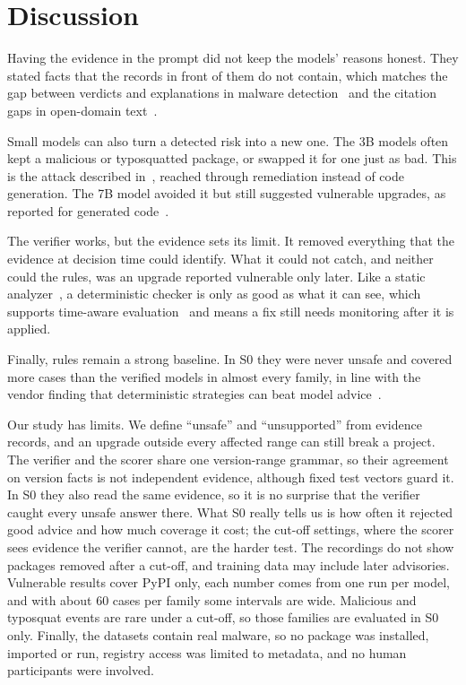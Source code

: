 \documentclass[conference]{IEEEtran}
\begin{document}
\section{Discussion}
Having the evidence in the prompt did not keep the models' reasons honest. They stated facts that the records in
front of them do not contain, which matches the gap between verdicts and explanations in malware
detection~\cite{ryan2026} and the citation gaps in open-domain text~\cite{gao2023}.

Small models can also turn a detected risk into a new one. The 3B models often kept a malicious or typosquatted
package, or swapped it for one just as bad. This is the attack described in~\cite{spracklen2025,neupane2023},
reached through remediation instead of code generation. The 7B model avoided it but still suggested vulnerable
upgrades, as reported for generated code~\cite{wang2026}.

The verifier works, but the evidence sets its limit. It removed everything that the evidence at decision time could
identify. What it could not catch, and neither could the rules, was an upgrade reported vulnerable only later. Like
a static analyzer~\cite{mirandapena2026}, a deterministic checker is only as good as what it can see, which supports
time-aware evaluation~\cite{singla2026} and means a fix still needs monitoring after it is applied.

Finally, rules remain a strong baseline. In S0 they were never unsafe and covered more cases than the verified
models in almost every family, in line with the vendor finding that deterministic strategies can beat model
advice~\cite{sonatype2026}.

Our study has limits. We define ``unsafe'' and ``unsupported'' from evidence records, and an upgrade outside every
affected range can still break a project. The verifier and the scorer share one version-range
grammar, so their agreement on version facts is not independent evidence, although fixed test vectors guard it. In
S0 they also read the same evidence, so it is no surprise that the verifier caught every unsafe answer there. What
S0 really tells us is how often it rejected good advice and how much coverage it cost; the cut-off settings, where
the scorer sees evidence the verifier cannot, are the harder test. The
recordings do not show packages removed after a cut-off, and training data may include later advisories.
Vulnerable results cover PyPI only, each number comes from one run per model, and with about 60 cases per family
some intervals are wide. Malicious and typosquat events are rare under a cut-off, so those families are evaluated
in S0 only. Finally, the datasets contain real malware, so no package was installed, imported or run, registry
access was limited to metadata, and no human participants were involved.
\end{document}
